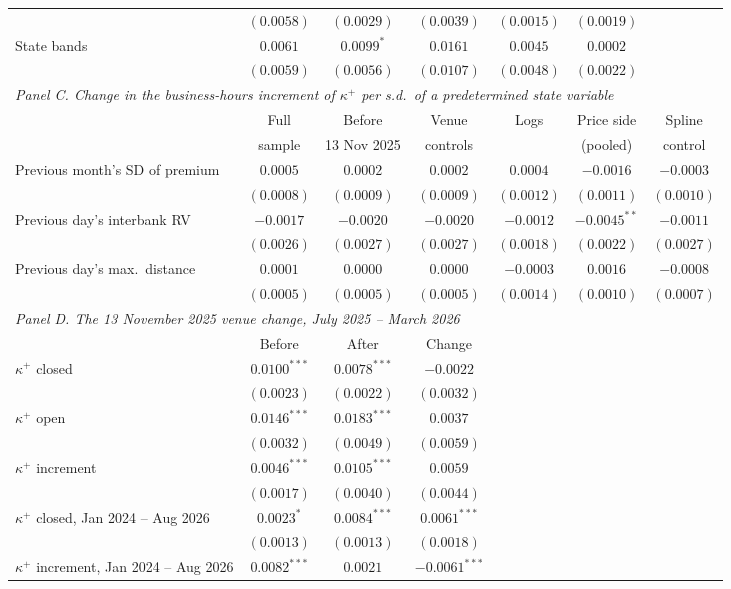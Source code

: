 \begin{tabular}{lcccccc}
 & $(0.0058)$ & $(0.0029)$ & $(0.0039)$ & $(0.0015)$ & $(0.0019)$ & \\
State bands & $0.0061$ & $0.0099^{*}$ & $0.0161$ & $0.0045$ & $0.0002$ & \\
 & $(0.0059)$ & $(0.0056)$ & $(0.0107)$ & $(0.0048)$ & $(0.0022)$ & \\
\midrule
\multicolumn{7}{l}{\emph{Panel C. Change in the business-hours increment of $\kappa^+$ per s.d.\ of a predetermined state variable}} \\
 & Full & Before & Venue & Logs & Price side & Spline \\
 & sample & 13 Nov 2025 & controls & & (pooled) & control \\
\midrule
Previous month's SD of premium & $0.0005$ & $0.0002$ & $0.0002$ & $0.0004$ & $-0.0016$ & $-0.0003$ \\
 & $(0.0008)$ & $(0.0009)$ & $(0.0009)$ & $(0.0012)$ & $(0.0011)$ & $(0.0010)$ \\
Previous day's interbank RV & $-0.0017$ & $-0.0020$ & $-0.0020$ & $-0.0012$ & $-0.0045^{**}$ & $-0.0011$ \\
 & $(0.0026)$ & $(0.0027)$ & $(0.0027)$ & $(0.0018)$ & $(0.0022)$ & $(0.0027)$ \\
Previous day's max.\ distance & $0.0001$ & $0.0000$ & $0.0000$ & $-0.0003$ & $0.0016$ & $-0.0008$ \\
 & $(0.0005)$ & $(0.0005)$ & $(0.0005)$ & $(0.0014)$ & $(0.0010)$ & $(0.0007)$ \\
\midrule
\multicolumn{7}{l}{\emph{Panel D. The 13 November 2025 venue change, July 2025 -- March 2026}} \\
 & Before & After & Change & & & \\
\midrule
$\kappa^+$ closed & $0.0100^{***}$ & $0.0078^{***}$ & $-0.0022$ & & & \\
 & $(0.0023)$ & $(0.0022)$ & $(0.0032)$ & & & \\
$\kappa^+$ open & $0.0146^{***}$ & $0.0183^{***}$ & $0.0037$ & & & \\
 & $(0.0032)$ & $(0.0049)$ & $(0.0059)$ & & & \\
$\kappa^+$ increment & $0.0046^{***}$ & $0.0105^{***}$ & $0.0059$ & & & \\
 & $(0.0017)$ & $(0.0040)$ & $(0.0044)$ & & & \\
$\kappa^+$ closed, Jan 2024 -- Aug 2026 & $0.0023^{*}$ & $0.0084^{***}$ & $0.0061^{***}$ & & & \\
 & $(0.0013)$ & $(0.0013)$ & $(0.0018)$ & & & \\
$\kappa^+$ increment, Jan 2024 -- Aug 2026 & $0.0082^{***}$ & $0.0021$ & $-0.0061^{***}$ & & & \\

\end{tabular}
